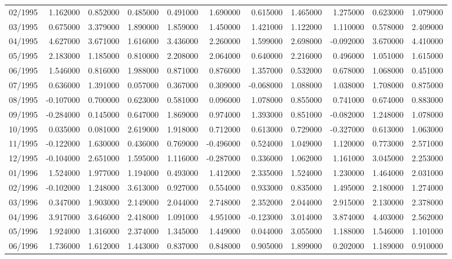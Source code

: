 \begin{tabular}{lrrrrrrrrrr}
02/1995 & 1.162000 & 0.852000 & 0.485000 & 0.491000 & 1.690000 & 0.615000 & 1.465000 & 1.275000 & 0.623000 & 1.079000 \\
03/1995 & 0.675000 & 3.379000 & 1.890000 & 1.859000 & 1.450000 & 1.421000 & 1.122000 & 1.110000 & 0.578000 & 2.409000 \\
04/1995 & 4.627000 & 3.671000 & 1.616000 & 3.436000 & 2.260000 & 1.599000 & 2.698000 & -0.092000 & 3.670000 & 4.410000 \\
05/1995 & 2.183000 & 1.185000 & 0.810000 & 2.208000 & 2.064000 & 0.640000 & 2.216000 & 0.496000 & 1.051000 & 1.615000 \\
06/1995 & 1.546000 & 0.816000 & 1.988000 & 0.871000 & 0.876000 & 1.357000 & 0.532000 & 0.678000 & 1.068000 & 0.451000 \\
07/1995 & 0.636000 & 1.391000 & 0.057000 & 0.367000 & 0.309000 & -0.068000 & 1.088000 & 1.038000 & 1.708000 & 0.875000 \\
08/1995 & -0.107000 & 0.700000 & 0.623000 & 0.581000 & 0.096000 & 1.078000 & 0.855000 & 0.741000 & 0.674000 & 0.883000 \\
09/1995 & -0.284000 & 0.145000 & 0.647000 & 1.869000 & 0.974000 & 1.393000 & 0.851000 & -0.082000 & 1.248000 & 1.078000 \\
10/1995 & 0.035000 & 0.081000 & 2.619000 & 1.918000 & 0.712000 & 0.613000 & 0.729000 & -0.327000 & 0.613000 & 1.063000 \\
11/1995 & -0.122000 & 1.630000 & 0.436000 & 0.769000 & -0.496000 & 0.524000 & 1.049000 & 1.120000 & 0.773000 & 2.571000 \\
12/1995 & -0.104000 & 2.651000 & 1.595000 & 1.116000 & -0.287000 & 0.336000 & 1.062000 & 1.161000 & 3.045000 & 2.253000 \\
01/1996 & 1.524000 & 1.977000 & 1.194000 & 0.493000 & 1.412000 & 2.335000 & 1.524000 & 1.230000 & 1.464000 & 2.031000 \\
02/1996 & -0.102000 & 1.248000 & 3.613000 & 0.927000 & 0.554000 & 0.933000 & 0.835000 & 1.495000 & 2.180000 & 1.274000 \\
03/1996 & 0.347000 & 1.903000 & 2.149000 & 2.044000 & 2.748000 & 2.352000 & 2.044000 & 2.915000 & 2.130000 & 2.378000 \\
04/1996 & 3.917000 & 3.646000 & 2.418000 & 1.091000 & 4.951000 & -0.123000 & 3.014000 & 3.874000 & 4.403000 & 2.562000 \\
05/1996 & 1.924000 & 1.316000 & 2.374000 & 1.345000 & 1.449000 & 0.044000 & 3.055000 & 1.188000 & 1.546000 & 1.101000 \\
06/1996 & 1.736000 & 1.612000 & 1.443000 & 0.837000 & 0.848000 & 0.905000 & 1.899000 & 0.202000 & 1.189000 & 0.910000 \\

\end{tabular}
